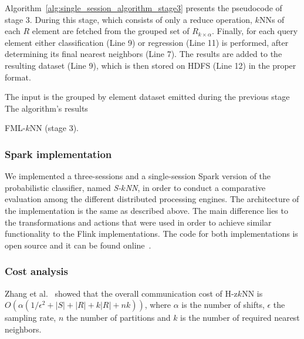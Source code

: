 Algorithm~\ref{alg:single_session_algorithm_stage3} presents the pseudocode of stage 3. During this stage, which consists of only a reduce operation, $k$NNs of each $R$ element are fetched from the grouped set of $R_{k \times \alpha}$. Finally, for each query element either classification (Line 9) or regression (Line 11) is performed, after determining its final nearest neighbors (Line 7). The results are added to the resulting dataset (Line 9), which is then stored on HDFS (Line 12) in the proper format.

\begin{algorithm}[!ht]
	\DontPrintSemicolon
	\begin{footnotesize}
	\Comment The input is the grouped by element dataset emitted during the previous stage \;
	\Comment The algorithm's results \;
	\BlankLine
	\end{footnotesize}
	\caption{FML-$k$NN (stage 3).}
	\label{alg:single_session_algorithm_stage3}
\end{algorithm}

\subsubsection{Spark implementation}
\label{par:spark}
We implemented a three-sessions and a single-session Spark version of the probabilistic classifier, named \textit{S-$k$NN}, in order to conduct a comparative evaluation among the different distributed processing engines. The architecture of the implementation is the same as described above. The main difference lies to the transformations and actions that were used in order to achieve similar functionality to the Flink implementations. The code for both implementations is open source and it can be found online~\cite{daiadAlgs}.

\subsubsection{Cost analysis}
\label{par:cost}
Zhang et al.~\cite{zhang2012epk} showed that the overall communication cost of H-z$k$NN is $O(\alpha(1/\epsilon^2 + |S| + |R| + k|R| + nk))$, where $\alpha$ is the number of shifts, $\epsilon$ the sampling rate, $n$ the number of partitions and $k$ is the number of required nearest neighbors. 

